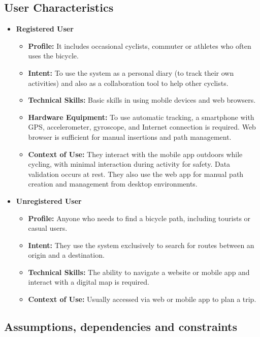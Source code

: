 \subsection{User Characteristics}

\begin{itemize}
    \item \textbf{Registered User}
    \begin{itemize}
        \item \textbf{Profile:} It includes occasional cyclists, commuter or athletes who often uses the bicycle.
        \item \textbf{Intent:} To use the system as a personal diary (to track their own activities) and also as a collaboration tool to help other cyclists.
        \item \textbf{Technical Skills:} Basic skills in using mobile devices and web browsers.
        \item \textbf{Hardware Equipment:} To use automatic tracking, a smartphone with GPS, accelerometer, gyroscope, and Internet connection is required. Web browser is sufficient for manual insertions and path management.
        \item \textbf{Context of Use:} They interact with the mobile app outdoors while cycling, with minimal interaction during activity for safety. Data validation occurs at rest. They also use the web app for manual path creation and management from desktop environments.
    \end{itemize}

    \item \textbf{Unregistered User}
    \begin{itemize}
        \item \textbf{Profile:} Anyone who needs to find a bicycle path, including tourists or casual users.
        \item \textbf{Intent:} They use the system exclusively to search for routes between an origin and a destination.
        \item \textbf{Technical Skills:} The ability to navigate a website or mobile app and interact with a digital map is required.
        \item \textbf{Context of Use:} Usually accessed via web or mobile app to plan a trip.
    \end{itemize}
\end{itemize}

\subsection{Assumptions, dependencies and constraints}

